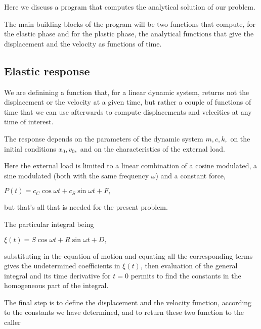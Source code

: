 \documentclass[11pt]{article}
\begin{document}
Here we discuss a program that computes the analytical solution of our
problem.

The main building blocks of the program will be two functions that
compute, for the elastic phase and for the plastic phase, the analytical
functions that give the displacement and the velocity as functions of
time.

    \subsection{Elastic response}\label{elastic-response}

We are definining a function that, for a linear dynamic system, returns
not the displacement or the velocity at a given time, but rather a
couple of functions of time that we can use afterwards to compute
displacements and velecities at any time of interest.

The response depends on the parameters of the dynamic system \(m,c,k,\)
on the initial conditions \(x_0, v_0,\) and on the characteristics of
the external load.

Here the external load is limited to a linear combination of a cosine
modulated, a sine modulated (both with the same frequency \(\omega\))
and a constant force,

\(P(t) = c_C \cos\omega t + c_S \sin\omega t + F,\)

but that's all that is needed for the present problem.

The particular integral being

\(\xi(t) = S \cos\omega t + R \sin\omega t + D,\)

substituting in the equation of motion and equating all the
corresponding terms gives the undetermined coefficients in \(\xi(t)\),
then evaluation of the general integral and its time derivative for
\(t=0\) permits to find the constants in the homogeneous part of the
integral.

The final step is to define the displacement and the velocity function,
according to the constants we have determined, and to return these two
function to the caller
\end{document}

